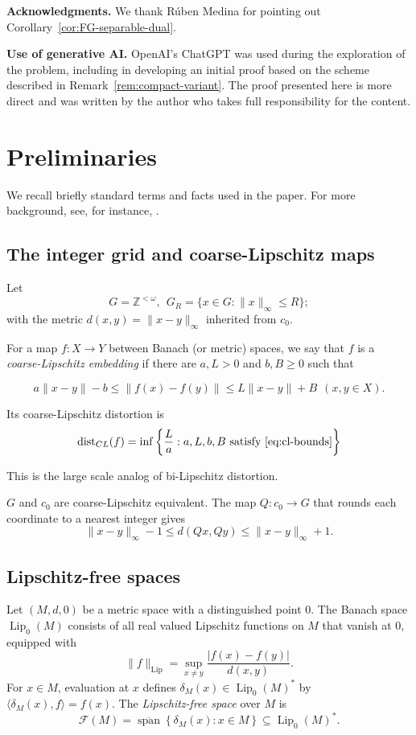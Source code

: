 \documentclass[11pt]{amsart}
\theoremstyle{definition}
\newcommand{\F}{\mathcal F}
\newcommand{\Lip}{\operatorname{Lip}}
\newcommand{\dist}{\operatorname{dist}}
\newcommand{\norm}[1]{\lVert#1\rVert}
\newcommand{\set}[1]{\left\{#1\right\}}
\def\Z{{\mathbb Z}}
\begin{document}
\medskip
\noindent\textbf{Acknowledgments.}
We thank R\'uben Medina for pointing out
Corollary~\ref{cor:FG-separable-dual}.

\medskip
\noindent\textbf{Use of generative AI.}
OpenAI's ChatGPT was used during the exploration of the problem,
including in developing an initial proof based on the scheme described in
Remark~\ref{rem:compact-variant}. The proof presented here is more direct and was written by the author who takes full responsibility for the content.



\section{Preliminaries}
We recall briefly standard terms and facts used in the paper. For more background, see, for instance, \cite{BL}.
\subsection{The integer grid and coarse-Lipschitz maps }
Let
$$
G=\Z^{<\omega},\ \ G_R=\{x\in G:\|x\|_{\infty}\le R\};
$$
with the metric $d(x,y)=\|x-y\|_{\infty}$ inherited from $c_0$.  

For a map $f:X\to Y$ between Banach (or metric) spaces, we say that $f$ is a {\em coarse-Lipschitz embedding} if there are $a, L>0$ and $b, B\ge 0$ such that

\begin{equation}\label{eq:cl-bounds}
a\|x-y\|-b\le \|f(x)-f(y)\|\le L\|x-y\|+B\ \ (x, y\in X).
\end{equation}

Its coarse-Lipschitz distortion is 
$$
\dist_{CL}(f)=\inf\set{\frac{L}{a}: a, L, b, B \text{ satisfy  \eqref{eq:cl-bounds}}}
$$

This is the large scale analog of bi-Lipschitz distortion. 

$G$ and $c_0$ are coarse-Lipschitz equivalent. The map $Q:c_0\to G$ that rounds each coordinate to a nearest integer gives
$$
\|x-y\|_{\infty}-1\le d(Qx, Qy)\le \|x-y\|_{\infty}+1.
$$


\subsection{Lipschitz-free spaces}
Let $(M,d,0)$ be a metric space with a distinguished point 0. The Banach space $\Lip_0(M)$ consists of all real valued Lipschitz functions on $M$ that vanish at 0, equipped with
$$
\norm{f}_{\Lip}=\sup_{x\neq y}\frac{|f(x)-f(y)|}{d(x,y)}.
$$
For $x\in M$, evaluation at $x$ defines $\delta_M(x)\in \Lip_0(M)^*$ by
$\langle \delta_M(x), f\rangle=f(x).$ The {\em Lipschitz-free space} over $M$ is
$$
\F(M)=\overline{\operatorname{span}}\set{\delta_M(x): x\in M}\subseteq \Lip_0(M)^*.
$$
\end{document}
